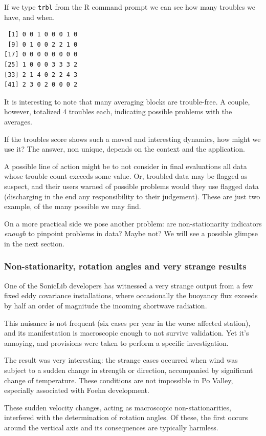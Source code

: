 \documentclass[a4paper,10pt]{book}
\begin{document}
If we type \verb|trbl| from the R command prompt we can see how many troubles we have, and when.

\begin{verbatim}
 [1] 0 0 1 0 0 0 1 0
 [9] 0 1 0 0 2 2 1 0
[17] 0 0 0 0 0 0 0 0
[25] 1 0 0 0 3 3 3 2
[33] 2 1 4 0 2 2 4 3
[41] 2 3 0 2 0 0 0 2
\end{verbatim}

It is interesting to note that many averaging blocks are trouble-free. A couple, however, totalized 4 troubles each, indicating possible problems with the averages.

If the troubles score shows such a moved and interesting dynamics, how might we use it? The answer, non unique, depends on the context and the application.

A possible line of action might be to not consider in final evaluations all data whose trouble count exceeds some value. Or, troubled data may be flagged as suspect, and their users warned of possible problems would they use flagged data (discharging in the end any responsibility to their judgement). These are just two example, of the many possible we may find.

On a more practical side we pose another problem: are non-stationarity indicators \emph{enough} to pinpoint problems in data? Maybe not? We will see a possible glimpse in the next section.

\subsubsection{Non-stationarity, rotation angles and very strange results}

One of the SonicLib developers has witnessed a very strange output from a few fixed eddy covariance installations, where occasionally the buoyancy flux exceeds by half an order of magnitude the incoming shortwave radiation.

This nuisance is not frequent (six cases per year in the worse affected station), and its manifestation is macroscopic enough to not survive validation. Yet it's annoying, and provisions were taken to perform a specific investigation.

The result was very interesting: the strange cases occurred when wind was subject to a sudden change in strength or direction, accompanied by significant change of temperature. These conditions are not impossible in Po Valley, especially associated with Foehn development.

These sudden velocity changes, acting as macroscopic non-stationarities, interfered with the determination of rotation angles. Of these, the first occurs around the vertical axis and its consequences are typically harmless.
\end{document}
